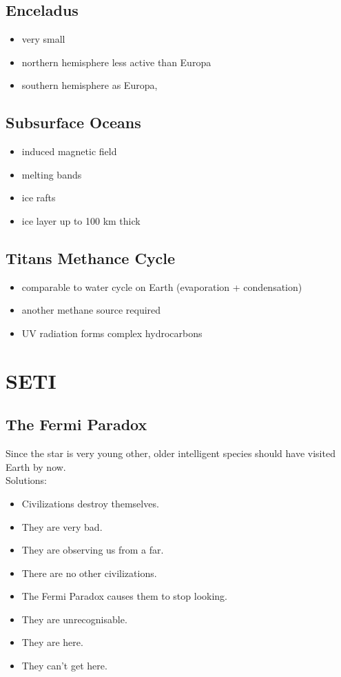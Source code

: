 \documentclass{article}
\theoremstyle{sltheorem}
\begin{document}
\subsection{Enceladus}
\begin{itemize}
    \item very small
    \item northern hemisphere less active than Europa
    \item southern hemisphere  as Europa, 
\end{itemize}
\subsection{Subsurface Oceans}
\begin{itemize}
    \item induced magnetic field
    \item melting bands
    \item ice rafts
    \item ice layer up to 100 km thick
\end{itemize}
\subsection{Titans Methance Cycle}
\begin{itemize}
    \item comparable to water cycle on Earth (evaporation + condensation)
    \item another methane source required
    \item UV radiation forms complex hydrocarbons
\end{itemize}
\section{SETI}
\subsection{The Fermi Paradox}
Since the star is very young other, older intelligent species should have visited Earth by now.\\
Solutions:
\begin{itemize}
    \item Civilizations destroy themselves.
    \item They are very bad.
    \item They are observing us from a far.
    \item There are no other civilizations.
    \item The Fermi Paradox causes them to stop looking.
    \item They are unrecognisable.
    \item They are here.
    \item They can't get here.
\end{itemize}
\end{document}
